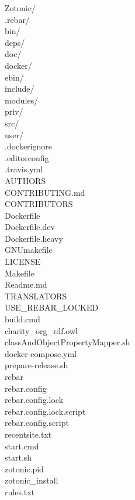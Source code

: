 \begin{tabbing}
	\qquad Zotonic/ \\
	\qquad \qquad .rebar/ \\
	\qquad \qquad bin/ \\
	\qquad \qquad deps/ \\
	\qquad \qquad doc/ \\
	\qquad \qquad docker/ \\
	\qquad \qquad ebin/ \\
	\qquad \qquad include/ \\
	\qquad \qquad modules/ \\
	\qquad \qquad priv/ \\
	\qquad \qquad src/ \\
	\qquad \qquad user/ \\
	\qquad \qquad .dockerignore \\
	\qquad \qquad .editorconfig \\
	\qquad \qquad .travis.yml \\
	\qquad \qquad AUTHORS \\
	\qquad \qquad CONTRIBUTING.md \\
	\qquad \qquad CONTRIBUTORS \\
	\qquad \qquad Dockerfile \\
	\qquad \qquad Dockerfile.dev \\
	\qquad \qquad Dockerfile.heavy \\
	\qquad \qquad GNUmakefile \\
	\qquad \qquad LICENSE\\
	\qquad \qquad Makefile \\
	\qquad \qquad Readme.md \\
	\qquad \qquad TRANSLATORS \\
	\qquad \qquad USE\_REBAR\_LOCKED \\
	\qquad \qquad build.cmd \\
	\qquad \qquad charity\_org\_rdf.owl \\
	\qquad \qquad classAndObjectPropertyMapper.sh \\
	\qquad \qquad docker-compose.yml \\
	\qquad \qquad prepare-release.sh \\
	\qquad \qquad rebar \\
	\qquad \qquad rebar.config\\
	\qquad \qquad rebar.config.lock\\
	\qquad \qquad rebar.config.lock.script\\
	\qquad \qquad rebar.config.script\\
	\qquad \qquad recentsite.txt\\
	\qquad \qquad start.cmd\\
	\qquad \qquad start.sh\\
	\qquad \qquad zotonic.pid\\
	\qquad \qquad zotonic\_install \\
	\qquad \qquad rules.txt
\end{tabbing}

